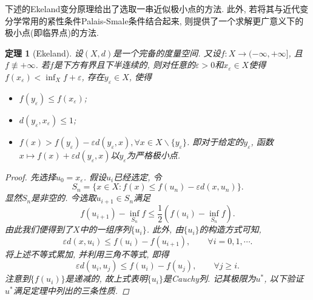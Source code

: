 \documentclass[12pt,a4paper]{article}
\newtheorem{theorem}{定理}[section]
\begin{document}
下述的Ekeland变分原理给出了选取一串近似极小点的方法. 此外, 若将其与近代变分学常用的紧性条件Palais-Smale条件结合起来, 则提供了一个求解更广意义下的极小点(即临界点)的方法. 

\begin{theorem}[Ekeland]
    设$(X, d)$是一个完备的度量空间. 又设$f\colon X \rightarrow (-\infty, +\infty]$, 且$f \not\equiv +\infty$.
    若$f$是下方有界且下半连续的, 则对任意的$\varepsilon > 0$和$x_{\varepsilon} \in X$使得$f(x_{\varepsilon}) < \inf_X f + \varepsilon$, 存在$y_{\varepsilon} \in X$, 使得 
    \begin{itemize}
        \item $f(y_{\varepsilon}) \leq f(x_{\varepsilon})$; 
        \item $d(y_{\varepsilon}, x_{\varepsilon}) \leq 1$;
        \item $f(x) > f(y_{\varepsilon}) - \varepsilon d(y_{\varepsilon}, x), \forall x \in X \smallsetminus \{y_{\varepsilon}\}$.
        即对于给定的$y_{\varepsilon}$, 函数$x \mapsto f(x) + \varepsilon d(y_{\varepsilon}, x)$以$y_{\varepsilon}$为严格极小点.
    \end{itemize}
    \begin{proof}
        先选择$u_0 = x_{\varepsilon}$. 假设$u_i$已经选定, 令 
        \begin{equation*}
            S_n = \{x \in X\colon f(x) \leq f(u_n) - \varepsilon d(x, u_n)\}.
        \end{equation*}
        显然$S_n$是非空的. 今选取$u_{i + 1} \in S_n$满足 
        \begin{equation}\label{46}
            f(u_{i + 1}) - \inf_{S_n}f \leq \frac{1}{2}\left(f(u_i) - \inf_{S_n}f\right).
        \end{equation}
        由此我们便得到了$X$中的一组序列$\{u_i\}$. 此外, 由$\{u_i\}$的构造方式可知, 
        \begin{equation*}
            \varepsilon d(x, u_i) \leq f(u_i) - f(u_{i + 1}), \qquad \forall i = 0, 1, \cdots.
        \end{equation*}
        将上述不等式累加, 并利用三角不等式, 即得 
        \begin{equation}\label{47}
            \varepsilon d(u_i, u_j) \leq f(u_i) - f(u_j), \qquad \forall j \geq i.
        \end{equation}
        注意到$\{f(u_i)\}$是递减的, 故上式表明$\{u_i\}$是Cauchy列. 记其极限为$u^*$, 以下验证$u^*$满足定理中列出的三条性质.


\end{proof}
\end{theorem}
\end{document}

